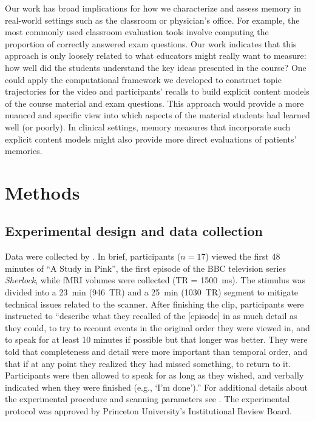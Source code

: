 \documentclass{article}
\begin{document}
Our work has broad implications for how we characterize and assess memory in real-world settings such as the classroom or physician's office.  For example, the most commonly used classroom evaluation tools involve computing the proportion of correctly answered exam questions.  Our work indicates that this approach is only loosely related to what educators might really want to measure: how well did the students understand the key ideas presented in the course?  One could apply the computational framework we developed to construct topic trajectories for the video and participants' recalls to build explicit content models of the course material and exam questions.  This approach would provide a more nuanced and specific view into which aspects of the material students had learned well (or poorly).  In clinical settings, memory measures that incorporate such explicit content models might also provide more direct evaluations of patients' memories.


\section*{Methods}
\label{sec:methods}

\subsection*{Experimental design and data collection}
Data were collected by \cite{ChenEtal17}.  In brief, participants ($n=17$) viewed the first 48 minutes of ``A Study in Pink'', the first episode of the BBC television series \textit{Sherlock}, while fMRI volumes were collected (TR = 1500~ms).  The stimulus was divided into a 23~min (946~TR) and a 25~min (1030~TR) segment to mitigate technical issues related to the scanner.  After finishing the clip, participants were instructed to \citep[quoting from][]{ChenEtal17} ``describe what they recalled of the [episode] in as much detail as they could, to try to recount events in the original order they were viewed in, and to speak for at least 10 minutes if possible but that longer was better. They were told that completeness and detail were more important than temporal order, and that if at any point they realized they had missed something, to return to it. Participants were then allowed to speak for as long as they wished, and verbally indicated when they were finished (e.g., `I’m done').''  For additional details about the experimental procedure and scanning parameters see \cite{ChenEtal17}.  The experimental protocol was approved by Princeton University's Institutional Review Board.
\end{document}
